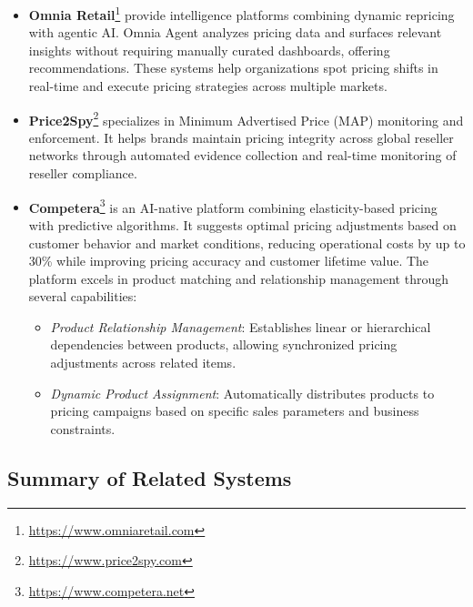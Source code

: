 \begin{itemize}

    \item \textbf{Omnia Retail}\footnote{\url{https://www.omniaretail.com}} provide intelligence platforms combining dynamic repricing with agentic AI.
    Omnia Agent analyzes pricing data and surfaces relevant insights without requiring manually curated dashboards, offering recommendations.
    These systems help organizations spot pricing shifts in real-time and execute pricing strategies across multiple markets.\cite{scrapewise_price_monitoring_2026}

    \item \textbf{Price2Spy}\footnote{\url{https://www.price2spy.com}} specializes in Minimum Advertised Price (MAP) monitoring and enforcement.
    It helps brands maintain pricing integrity across global reseller networks through automated evidence collection and real-time monitoring of reseller compliance.\cite{scrapewise_price_monitoring_2026}

    \item \textbf{Competera}\footnote{\url{https://www.competera.net}} is an AI-native platform combining elasticity-based pricing with predictive algorithms.
    It suggests optimal pricing adjustments based on customer behavior and market conditions, reducing operational costs by up to 30\% while improving pricing accuracy and customer lifetime value.\cite{competera_product_matching}
    The platform excels in product matching and relationship management through several capabilities:
    \begin{itemize}
        \item \textit{Product Relationship Management}: Establishes linear or hierarchical dependencies between products, allowing synchronized pricing adjustments across related items.
        \item \textit{Dynamic Product Assignment}: Automatically distributes products to pricing campaigns based on specific sales parameters and business constraints.
    \end{itemize}

\end{itemize}

\subsection{Summary of Related Systems}\label{sec:related_work_summary}

